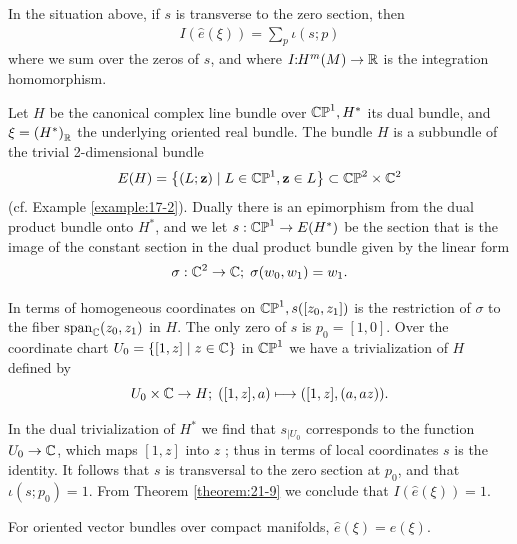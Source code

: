 \begin{theorem}\label{theorem:21-9}
  In the situation above, if $s$ is transverse to the zero section, then
  \begin{align}\label{eq:21-5}
    I({\hat{e}( \xi ) })  = \mathop{\sum }\limits_{p}\iota ( {s;p})
  \end{align}
  where we sum over the zeros of $s$, and where $I\!\!:\!\! H^m( M)  \rightarrow  {\ensuremath{\mathbb{R}}}$ is the integration 
  homomorphism.
\end{theorem}


\begin{example}\label{example:21-10}
  Let $H$ be the canonical complex line bundle over ${\mathbb{CP}}^{1},{H}^*$ its dual bundle, 
  and $\xi  = {( {H}^*) }_{\mathbb{R}}$ the underlying oriented real bundle. The bundle $H$ is a subbundle 
  of the trivial 2-dimensional bundle
  \[
    E( H)  = \left\{  {( {L;\mathbf{z}})  \mid  L \in  {\mathbb{CP}}^{1},\mathbf{z} \in  L}\right\}  
    \subset {\mathbb{CP}}^{2} \times  {{\ensuremath{\mathbb{C}}}}^{2}
  \]
  (cf. Example \ref{example:17-2}). Dually there is an epimorphism from the dual product bundle 
  onto ${H}^*$, and we let $s : {\mathbb{CP}}^{1} \rightarrow E(H^*)$ be the section that is the image 
  of the constant section in the dual product bundle given by the linear form
  \[
    \sigma: {{\mathbb{C}}}^{2} \rightarrow  {\ensuremath{\mathbb{C}}};\;\sigma ( {{w}_{0},{w}_{1}})  = {w}_{1}.
  \]
  
  In terms of homogeneous coordinates on ${\mathbb{CP}}^{1},s( [  {{z}_{0},{z}_{1}}])$ is the restriction of $\sigma$ to 
  the fiber ${\mathrm{span}}_{{\mathbb{C}}}( {{z}_{0},{z}_{1}})$ in $H$. The only zero of $s$ is ${p}_{0} = [  {1,0}]$. Over 
  the coordinate chart ${U}_{0} = \{ [  {1,z}]   \mid  z \in  {\ensuremath{\mathbb{C}}}\}$ in ${\mathbb{CP}}^{1}$ we have a trivialization 
  of $H$ defined by 
  \[
    {U}_{0} \times  {\ensuremath{\mathbb{C}}} \rightarrow  H;\;( {[  {1,z}] ,a})\longmapsto ([1, z], (a, az)).
  \]
  
  In the dual trivialization of ${H}^*$ we find that ${s}_{\mid {U}_{0}}$ corresponds to the 
  function ${U}_{0} \rightarrow  {\ensuremath{\mathbb{C}}}$, which maps $[  {1,z}]$ into $z$ ; thus in terms of local coordinates $s$ 
  is the identity. It follows that $s$ is transversal to the zero section at ${p}_{0}$, and 
  that $\iota ( {s;{p}_{0}}) = 1$. From Theorem \ref{theorem:21-9} we conclude that $I(\hat{e}(\xi)) = 1$.
\end{example}


\begin{theorem}\label{theorem:21-11}
  For oriented vector bundles over compact manifolds, $\hat{e}( \xi )  = e( \xi )$.
\end{theorem}

